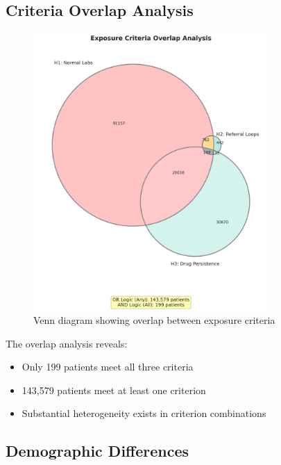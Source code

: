 \documentclass[11pt]{article}
\begin{document}
\subsection{Criteria Overlap Analysis}

\begin{figure}[H]
\centering
\includegraphics[width=0.8\textwidth]{criteria_venn_diagram.png}
\caption{Venn diagram showing overlap between exposure criteria}
\end{figure}

The overlap analysis reveals:
\begin{itemize}
\item Only 199 patients meet all three criteria
\item 143,579 patients meet at least one criterion
\item Substantial heterogeneity exists in criterion combinations
\end{itemize}

\subsection{Demographic Differences}
\end{document}
